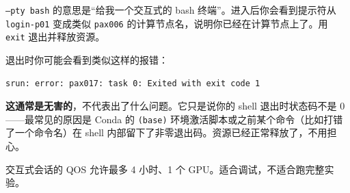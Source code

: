 \texttt{--pty bash} 的意思是``给我一个交互式的 bash 终端''。进入后你会看到提示符从 \texttt{login-p01} 变成类似 \texttt{pax006} 的计算节点名，说明你已经在计算节点上了。用 \texttt{exit} 退出并释放资源。

\begin{tipbox}
退出时你可能会看到类似这样的报错：
\begin{lstlisting}
srun: error: pax017: task 0: Exited with exit code 1
\end{lstlisting}
\textbf{这通常是无害的}，不代表出了什么问题。它只是说你的 shell 退出时状态码不是 0——最常见的原因是 Conda 的 \texttt{(base)} 环境激活脚本或之前某个命令（比如打错了一个命令名）在 shell 内部留下了非零退出码。资源已经正常释放了，不用担心。
\end{tipbox}

\begin{tipbox}
交互式会话的 QOS 允许最多 4 小时、1 个 GPU。适合调试，不适合跑完整实验。
\end{tipbox}
